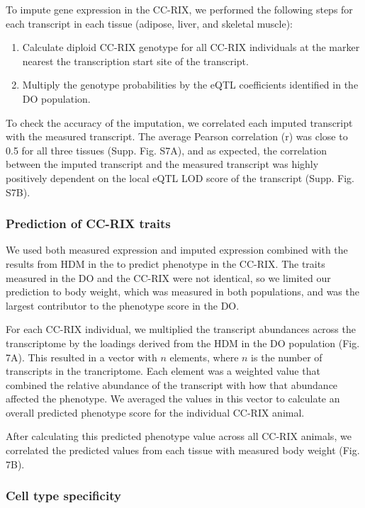 \documentclass[
]{article}
\providecommand{\tightlist}{%
  \setlength{\itemsep}{0pt}\setlength{\parskip}{0pt}}
\begin{document}
To impute gene expression in the CC-RIX, we performed the following
steps for each transcript in each tissue (adipose, liver, and skeletal
muscle):

\begin{enumerate}
\def\labelenumi{\arabic{enumi}.}
\tightlist
\item
  Calculate diploid CC-RIX genotype for all CC-RIX individuals at the
  marker nearest the transcription start site of the transcript.
\item
  Multiply the genotype probabilities by the eQTL coefficients
  identified in the DO population.
\end{enumerate}

To check the accuracy of the imputation, we correlated each imputed
transcript with the measured transcript. The average Pearson correlation
(r) was close to 0.5 for all three tissues (Supp. Fig. S7A), and as
expected, the correlation between the imputed transcript and the
measured transcript was highly positively dependent on the local eQTL
LOD score of the transcript (Supp. Fig. S7B).

\subsubsection{Prediction of CC-RIX
traits}\label{prediction-of-cc-rix-traits}

We used both measured expression and imputed expression combined with
the results from HDM in the to predict phenotype in the CC-RIX. The
traits measured in the DO and the CC-RIX were not identical, so we
limited our prediction to body weight, which was measured in both
populations, and was the largest contributor to the phenotype score in
the DO.

For each CC-RIX individual, we multiplied the transcript abundances
across the transcriptome by the loadings derived from the HDM in the DO
population (Fig. 7A). This resulted in a vector with \(n\) elements,
where \(n\) is the number of transcripts in the trancriptome. Each
element was a weighted value that combined the relative abundance of the
transcript with how that abundance affected the phenotype. We averaged
the values in this vector to calculate an overall predicted phenotype
score for the individual CC-RIX animal.

After calculating this predicted phenotype value across all CC-RIX
animals, we correlated the predicted values from each tissue with
measured body weight (Fig. 7B).

\subsubsection{Cell type specificity}\label{cell-type-specificity}
\end{document}
